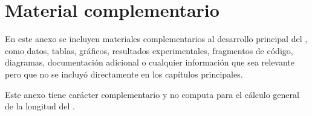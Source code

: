 
\chapter{Material complementario}
\label{anx:complementario}

En este anexo se incluyen materiales complementarios al desarrollo principal del \tipotrabajoCorto, como datos, tablas, gráficos, resultados experimentales, fragmentos de código, diagramas, documentación adicional o cualquier información que sea relevante pero que no se incluyó directamente en los capítulos principales.

Este anexo tiene carácter complementario y no computa para el cálculo general de la longitud del \tipotrabajoCorto.

